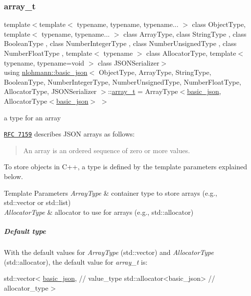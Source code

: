 \subsubsection{\texorpdfstring{array\+\_\+t}{array\_t}}
{\footnotesize\ttfamily template$<$template$<$ typename, typename, typename... $>$ class Object\+Type, template$<$ typename, typename... $>$ class Array\+Type, class String\+Type , class Boolean\+Type , class Number\+Integer\+Type , class Number\+Unsigned\+Type , class Number\+Float\+Type , template$<$ typename $>$ class Allocator\+Type, template$<$ typename, typename=void $>$ class J\+S\+O\+N\+Serializer$>$ \\
using \hyperlink{classnlohmann_1_1basic__json}{nlohmann\+::basic\+\_\+json}$<$ Object\+Type, Array\+Type, String\+Type, Boolean\+Type, Number\+Integer\+Type, Number\+Unsigned\+Type, Number\+Float\+Type, Allocator\+Type, J\+S\+O\+N\+Serializer $>$\+::\hyperlink{classnlohmann_1_1basic__json_ae095578e03df97c5b3991787f1056374}{array\+\_\+t} =  Array\+Type$<$\hyperlink{classnlohmann_1_1basic__json}{basic\+\_\+json}, Allocator\+Type$<$\hyperlink{classnlohmann_1_1basic__json}{basic\+\_\+json}$>$ $>$}



a type for an array 

\href{http://rfc7159.net/rfc7159}{\tt R\+FC 7159} describes J\+S\+ON arrays as follows\+: \begin{quote}
An array is an ordered sequence of zero or more values. \end{quote}


To store objects in C++, a type is defined by the template parameters explained below.


\begin{DoxyTemplParams}{Template Parameters}
{\em Array\+Type} & container type to store arrays (e.\+g., {\ttfamily std\+::vector} or {\ttfamily std\+::list}) \\
\hline
{\em Allocator\+Type} & allocator to use for arrays (e.\+g., {\ttfamily std\+::allocator})\\
\hline
\end{DoxyTemplParams}
\subparagraph*{Default type}

With the default values for {\itshape Array\+Type} ({\ttfamily std\+::vector}) and {\itshape Allocator\+Type} ({\ttfamily std\+::allocator}), the default value for {\itshape array\+\_\+t} is\+:


\begin{DoxyCode}
std::vector<
  \hyperlink{classnlohmann_1_1basic__json_aed115142bd0c6c66c864700e0467df55}{basic\_json}, \textcolor{comment}{// value\_type}
  std::allocator<basic\_json> \textcolor{comment}{// allocator\_type}
>
\end{DoxyCode}


